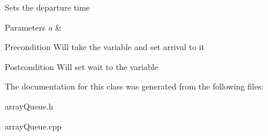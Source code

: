 Sets the departure time 
\begin{DoxyParams}{Parameters}
{\em a} & \\
\hline
\end{DoxyParams}
\begin{DoxyPrecond}{Precondition}
Will take the variable and set arrival to it 
\end{DoxyPrecond}
\begin{DoxyPostcond}{Postcondition}
Will set wait to the variable 
\end{DoxyPostcond}


The documentation for this class was generated from the following files\+:\begin{DoxyCompactItemize}
\item 
array\+Queue.\+h\item 
array\+Queue.\+cpp\end{DoxyCompactItemize}
